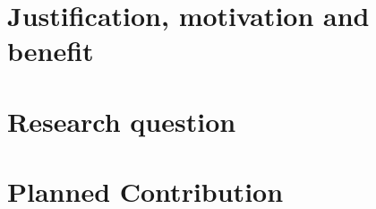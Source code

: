 \section{Justification, motivation and benefit}
\section{Research question}

\section{Planned Contribution}

